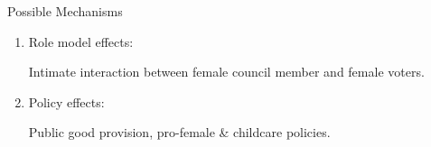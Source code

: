 \documentclass[
  10pt,
  ignorenonframetext,
  aspectratio=43,
]{beamer}
\begin{document}
\begin{frame}{Possible Mechanisms}
\protect\hypertarget{possible-mechanisms}{}
\begin{enumerate}
\item
  Role model effects:

  Intimate interaction between female council member and female voters.
\item
  Policy effects:

  Public good provision, pro-female \& childcare policies.
\end{enumerate}
\end{frame}
\end{document}
